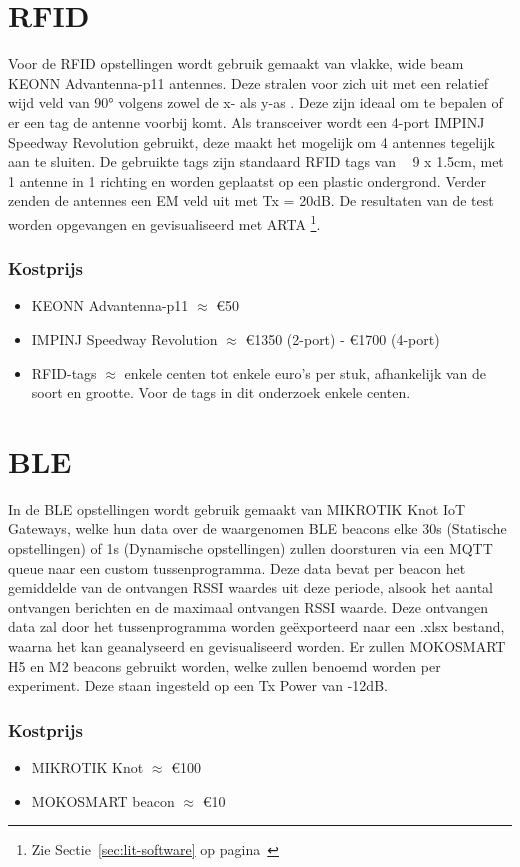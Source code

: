 \section{RFID}
\label{sec:met-rfid}
Voor de RFID opstellingen wordt gebruik gemaakt van vlakke, wide beam KEONN Advantenna-p11 antennes. Deze stralen voor zich uit met een relatief wijd veld van 90° volgens zowel de x- als y-as \autocite{Keonn}. Deze zijn ideaal om te bepalen of er een tag de antenne voorbij komt.
Als transceiver wordt een 4-port IMPINJ Speedway Revolution gebruikt, deze maakt het mogelijk om 4 antennes tegelijk aan te sluiten. De gebruikte tags zijn standaard RFID tags van ~ 9 x 1.5cm, met 1 antenne in 1 richting en worden geplaatst op een plastic ondergrond. Verder zenden de antennes een EM veld uit met Tx = 20dB. De resultaten van de test worden opgevangen en gevisualiseerd met ARTA \footnote{Zie Sectie~\ref{sec:lit-software} op pagina~\pageref{sec:lit-software}}.

\subsubsection{Kostprijs}
\begin{itemize}
\item KEONN Advantenna-p11 \(\approx\) €50 \autocite{theRFIDstore2022}
\item IMPINJ Speedway Revolution \(\approx\) €1350 (2-port) - €1700 (4-port) \autocite{theRFIDstore2022a}
\item RFID-tags \(\approx\) enkele centen tot enkele euro's per stuk, afhankelijk van de soort en grootte. Voor de tags in dit onderzoek enkele centen. \autocite{LogisCenter2022}
\end{itemize}

\section{BLE}
\label{sec:met-ble}
In de BLE opstellingen wordt gebruik gemaakt van MIKROTIK Knot IoT Gateways, welke hun data over de waargenomen BLE beacons elke 30s (Statische opstellingen) of 1s (Dynamische opstellingen) zullen doorsturen via een MQTT queue naar een custom tussenprogramma. Deze data bevat per beacon het gemiddelde van de ontvangen RSSI waardes uit deze periode, alsook het aantal ontvangen berichten en de maximaal ontvangen RSSI waarde. Deze ontvangen data zal door het tussenprogramma worden geëxporteerd naar een .xlsx bestand, waarna het kan geanalyseerd en gevisualiseerd worden. Er zullen MOKOSMART H5 en M2 beacons gebruikt worden, welke zullen benoemd worden per experiment. Deze staan ingesteld op een Tx Power van -12dB.

\subsubsection{Kostprijs}
\begin{itemize}
	\item MIKROTIK Knot \(\approx\) €100 \autocite{Mikrotik2020}
	\item MOKOSMART beacon \(\approx\) €10 \autocite{MarCom2021}
\end{itemize}



